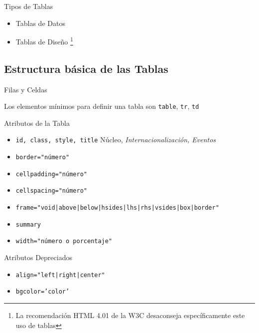 \documentclass{beamer}
\begin{document}
\begin{frame}{Tipos de Tablas} %
   \begin{center}
       \begin{itemize}
           \item Tablas de Datos
           \item Tablas de Diseño \footnote{La recomendación HTML 4.01 de la
           W3C desaconseja específicamente este uso de tablas}
       \end{itemize}
   \end{center}
\end{frame}

\subsection{Estructura básica de las Tablas} %

\begin{frame}{Filas y Celdas} %
\begin{center}
    Los elementos mínimos para definir una tabla son \texttt{table},
    \texttt{tr}, \texttt{td}
\end{center}
\end{frame}

\begin{frame}{Atributos de la Tabla} %
    \begin{center}
        {\footnotesize
        \begin{itemize}
            \item \texttt{id, class, style, title} Núcleo,
            \textit{Internacionalización,  Eventos}
            \item \texttt{border="número"}
            \item \texttt{cellpadding="número"}
            \item \texttt{cellspacing="número"}
            \item \texttt{frame="void|above|below|hsides|lhs|rhs|vsides|box|border"}
            \item \texttt{summary}
            \item \texttt{width="número o porcentaje"}
        \end{itemize}
        }
    \end{center}
\end{frame}

\begin{frame}{Atributos Depreciados} %
    \begin{center}
        \begin{itemize}
            \item \texttt{align="left|right|center"}
            \item \texttt{bgcolor='color'}
        \end{itemize}
    \end{center}
\end{frame}
\end{document}
